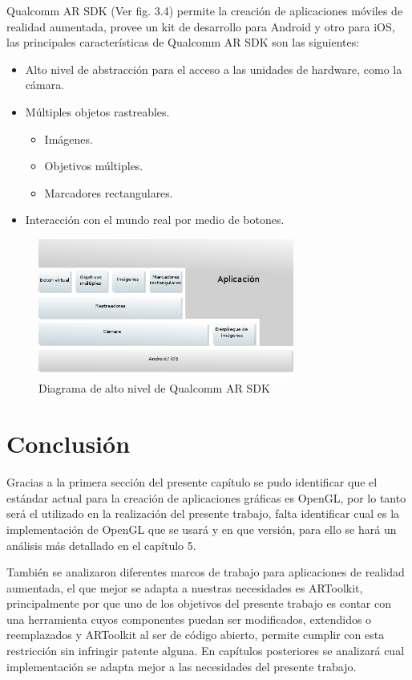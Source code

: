 \documentclass[12pt,a4paper,spanish,openany]{book}
\begin{document}
Qualcomm AR SDK (Ver fig. 3.4) permite la creación de aplicaciones móviles de
realidad aumentada, provee un kit de desarrollo para Android y otro para iOS, las
principales características de Qualcomm AR SDK son las siguientes:

\begin{itemize}
  \item Alto nivel de abstracción para el acceso a las unidades de hardware,
  como la cámara.
  \item Múltiples objetos rastreables.
    \begin{itemize}
      \item Imágenes.
      \item Objetivos múltiples.
      \item Marcadores rectangulares.      
    \end{itemize}
  \item Interacción con el mundo real por medio de botones.  
\end{itemize}


\begin{figure}
\begin{center}
\includegraphics[width=0.75\textwidth]{./img/qcar.jpg}
\caption{Diagrama de alto nivel de Qualcomm AR SDK}
\end{center}
\end{figure}

\section{Conclusión}
Gracias a la primera sección del presente capítulo se pudo identificar que el
estándar actual para la creación de aplicaciones gráficas es OpenGL, por lo
tanto será el utilizado en la realización del presente trabajo, falta
identificar cual es la implementación de OpenGL que se usará y en que versión,
para ello se hará un análisis más detallado en el capítulo 5.

También se analizaron diferentes marcos de trabajo para aplicaciones de realidad
aumentada, el que mejor se adapta a nuestras necesidades es ARToolkit,
principalmente por que uno de los objetivos del presente trabajo es contar con
una herramienta cuyos componentes puedan ser modificados, extendidos o
reemplazados y ARToolkit al ser de código abierto, permite cumplir con esta
restricción sin infringir patente alguna. En capítulos posteriores se analizará
cual implementación se adapta mejor a las necesidades del presente trabajo.
\end{document}
